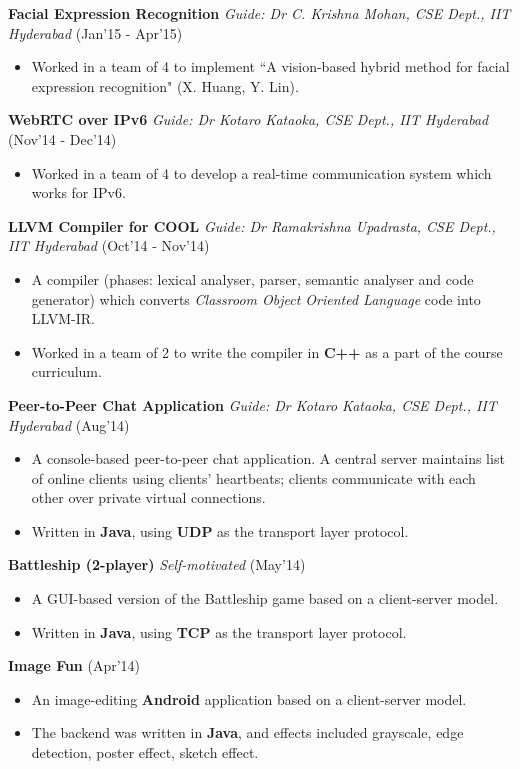 \documentclass[8pt]{extarticle}
\begin{document}
\space
\textbf{Facial Expression Recognition} \textit{Guide: Dr C. Krishna Mohan, CSE Dept., IIT Hyderabad} \hfill (Jan'15 - Apr'15)
\begin{itemize}
\item Worked in a team of 4 to implement ``A vision-based hybrid method for facial expression recognition" (X. Huang, Y. Lin).
\end{itemize}
\space
\textbf{WebRTC over IPv6} \textit{Guide: Dr Kotaro Kataoka, CSE Dept., IIT Hyderabad} \hfill (Nov'14 - Dec'14)
\begin{itemize}
\item Worked in a team of 4 to develop a real-time communication system which works for IPv6.
\end{itemize}
\space
\textbf{LLVM Compiler for COOL} \textit{Guide: Dr Ramakrishna Upadrasta, CSE Dept., IIT Hyderabad} \hfill (Oct'14 - Nov'14)
\begin{itemize}
\item A compiler (phases: lexical analyser, parser, semantic analyser and code generator) which converts \textit{Classroom Object Oriented Language} code into LLVM-IR.
\item Worked in a team of 2 to write the compiler in \textbf{C++} as a part of the course curriculum.
\end{itemize}
\space
\textbf{Peer-to-Peer Chat Application} \textit{Guide: Dr Kotaro Kataoka, CSE Dept., IIT Hyderabad} \hfill (Aug'14)
\begin{itemize}
\item A console-based peer-to-peer chat application. A central server maintains list of online clients using clients’ heartbeats; clients communicate with each other over private virtual connections.
\item Written in \textbf{Java}, using \textbf{UDP} as the transport layer protocol.
\end{itemize}
\space
\textbf{Battleship (2-player)} \textit{Self-motivated} \hfill (May'14)
\begin{itemize}
\item A GUI-based version of the Battleship game based on a client-server model.
\item Written in \textbf{Java}, using \textbf{TCP} as the transport layer protocol.
\end{itemize}
\textbf{Image Fun} \hfill (Apr'14)
\begin{itemize}
\item An image-editing \textbf{Android} application based on a client-server model.
\item The backend was written in \textbf{Java}, and effects included grayscale, edge detection, poster effect, sketch effect.
\end{itemize}
\end{document}
